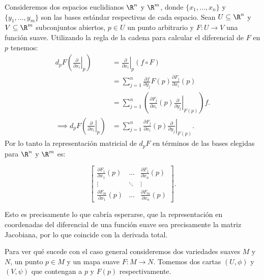 Consideremos dos espacios euclidianos $\R^n$ y $\R^m$, donde $\{x_1, \dots, x_n\}$ y $\{y_1, \dots, y_m\}$ son las bases estándar respectivas de cada espacio. Sean $U \subseteq \R^n$ y $V \subseteq \R^m$ subconjuntos abiertos, $p \in U$ un punto arbitrario y $F: U \to V$ una función suave. Utilizando la regla de la cadena para calcular el diferencial de $F$ en $p$ tenemos:
\begin{align*}
	d_{p}F
	\left(
	\left. \frac{\partial}{\partial x_i} \right|_{p}
	\right)
	 & =
	\left. \frac{\partial}{\partial x_i} \right|_{p} (f \circ F) \\
	 & =
	\sum_{j=1}^{n} \frac{\partial f}{\partial y_j} F(p)
	\frac{\partial F_j}{\partial x_i} (p)                        \\
	 & =
	\sum_{j=1}^{n}
	\left(
	\frac{\partial F_j}{\partial x_i} (p)
	\left.
	\frac{\partial}{\partial y_j}
	\right|_{F(p)}
	\right) f.                                                   \\
	\implies d_p F
	\left(
	\left. \frac{\partial}{\partial x_i} \right|_p
	\right)
	 & =
	\sum_{j=1}^{n}
	\frac{\partial F_j}{\partial x_i} (p)
	\left.
	\frac{\partial}{\partial y_j}
	\right|_{F(p)}.
\end{align*}
Por lo tanto la representación matricial de $d_{p}F$ en términos de las bases elegidas para $\R^n$ y $\R^m$ es:

\[
	\begin{bmatrix}
		\frac{\partial F_1}{\partial x_1}(p) & \hdots & \frac{\partial F_1}{\partial x_n}(p) \\[24pt]
		\vdots                               & \ddots & \vdots                               \\[24pt]
		\frac{\partial F_m}{\partial x_1}(p) & \hdots & \frac{\partial F_m}{\partial x_n}(p)
	\end{bmatrix}.
\]

Esto es precisamente lo que cabría esperarse, que la representación en coordenadas del diferencial de una función suave sea precisamente la matriz Jacobiana, por lo que coincide con la derivada total.

Para ver qué sucede con el caso general consideremos dos variedades suaves $M$ y $N$, un punto $p \in M$ y un mapa suave $F: M \to N$. Tomemos dos cartas $(U,\phi)$ y $(V,\psi)$ que contengan a $p$ y $F(p)$ respectivamente.


